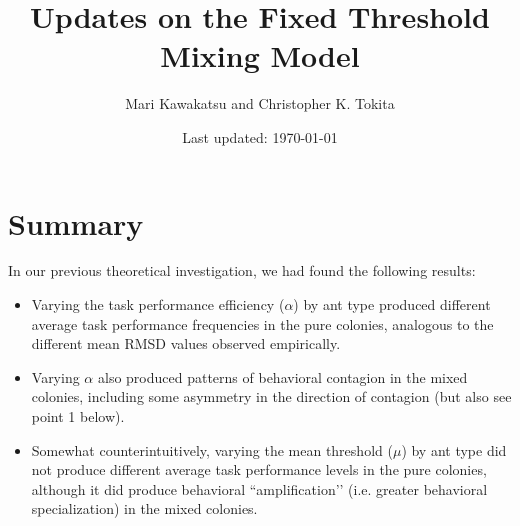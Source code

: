 \documentclass[11pt]{article}
\title{\vspace{-30pt}Updates on the Fixed Threshold Mixing Model}
\author{Mari Kawakatsu and Christopher K. Tokita\vspace{-10pt}}
\date{Last updated: \today}
\begin{document}
\maketitle

\vspace{-10pt}
\tableofcontents

\section{Summary}

In our previous theoretical investigation, we had found the following results:
\begin{itemize}

    \item Varying the task performance efficiency ($\alpha$) by ant type produced different average task performance frequencies in the pure colonies, analogous to the different mean RMSD values observed empirically.
    
    \item Varying $\alpha$ also produced patterns of behavioral contagion in the mixed colonies, including  some asymmetry in the direction of contagion (but also see point 1 below).
    
    \item Somewhat counterintuitively, varying the mean threshold ($\mu$) by ant type did not produce different average task performance levels in the pure colonies, although it did produce behavioral ``amplification’’ (i.e. greater behavioral specialization) in the mixed colonies.

\end{itemize}
\end{document}
